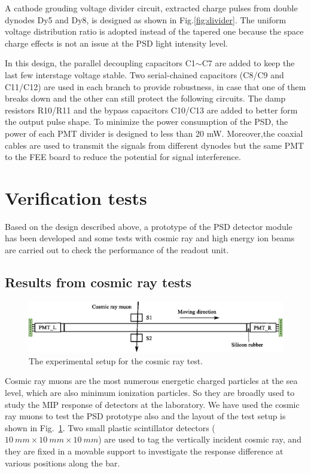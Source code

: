 \documentclass[preprint, times]{elsarticle}
\begin{document}
A cathode grouding voltage divider circuit, extracted charge pulses from double dynodes Dy5 and Dy8, is designed as shown in Fig.\ref{fig:divider}.
The uniform voltage distribution ratio is adopted instead of the tapered one because the space charge effects is not an issue at the PSD light intensity level.

In this design, the parallel decoupling capacitors C1$\sim$C7 are added to keep the last few interstage voltage stable. Two serial-chained capacitors (C8/C9 and C11/C12) are used in each branch to provide robustness, in case that one of them breaks down and the other can still protect the following circuits. The damp resistors R10/R11 and the bypass capacitors C10/C13 are added to better form the output pulse shape. To minimize the power consumption of the PSD, the power of each PMT divider is designed to less than 20 mW. Moreover,the coaxial cables are used to transmit  the signals from different dynodes but the same PMT to the FEE board to reduce the potential for signal interference.


\section{Verification tests}
\label{sec:result}
Based on the design described above, a prototype of the PSD detector module has been developed and some tests with cosmic ray and high energy ion beams are carried out to check the performance of the readout unit.

\subsection{Results from cosmic ray tests}
\label{sec:cosmicray}

\begin{figure}
 \centering
 \includegraphics[width=130mm]{cosmic_test}
\caption{The experimental setup for the cosmic ray test.}
\label{fig:cosmic_test}
\end{figure}

Cosmic ray muons are the most numerous energetic charged particles at the sea level, which are also minimum ionization particles. So they are broadly used to study the MIP response of detectors at the laboratory.
We have used the cosmic ray muons to test the PSD prototype also and the layout of the test setup is shown in Fig.~\ref{fig:cosmic_test}.
Two small plastic scintillator detectors ($\SI{10}{mm} \times \SI{10}{mm} \times \SI{10}{mm}$) are used to tag the vertically incident cosmic ray, and they are fixed in a movable support to investigate the response difference at various positions along the bar.
\end{document}
